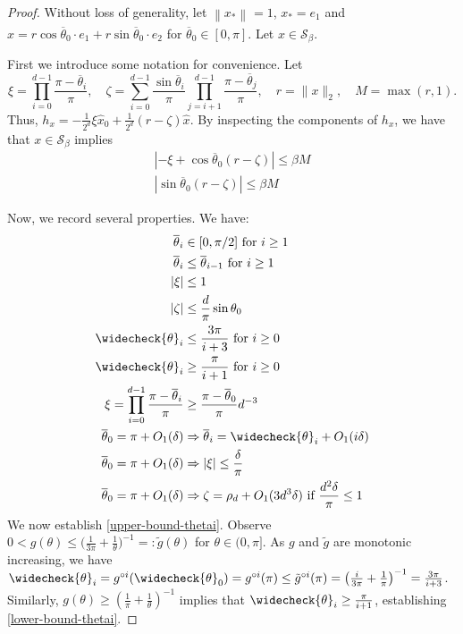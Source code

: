 \documentclass[11pt]{article}
\newcommand{\gtilde}{\tilde{g}}
\newcommand{\thetabar}{\overline{\theta}}
\newcommand{\thetacheck}{\widecheck{\theta}}
\newcommand{\zetacheck}{\rho}
\newcommand{\xo}{x_\ast}
\newcommand{\xhat}{\hat{x}}
\newcommand{\xohat}{\hat{x}_0}
\newcommand{\Pipithetapii}{\prod_{i=0}^{d-1} \frac{\pi - \thetabar_i}{\pi}}
\newcommand{\zetaterm}{\sum_{i=0}^{d-1} \frac{\sin \thetabar_i}{\pi} \prod_{j=i+1}^{d-1} \frac{\pi - \thetabar_j}{\pi}}
\newcommand{\hx}{h_x}
\newcommand{\Tnorm}{}
\newcommand\norm[2][\Tnorm]{\ensuremath{{\left\|#2\right\|}_{#1}}}
\newcommand\setS{\mathcal S}
\begin{document}
\begin{proof}
Without loss of generality, let $\norm{\xo}
 =1$, $\xo = e_1$ and $\xhat = r \cos \thetabar_0 \cdot e_1 + r \sin \thetabar_0 \cdot e_2$ for $\thetabar_0 \in [0, \pi]$.  Let $x \in \setS_\beta$.

First we introduce some notation for convenience.  Let
\[
\xi = \Pipithetapii, \quad \zeta = \zetaterm, \quad r = \|x\|_2, \quad M = \max(r, 1).
\]
Thus, $\hx = - \frac{1}{2^d}\xi  \xohat + \frac{1}{2^d} (r- \zeta) \xhat$.
By inspecting the components of $\hx$, we have that $x\in \setS_\beta$ implies
\begin{align}
|-\xi + \cos \thetabar_0 ( r - \zeta)| \leq \beta M \label{Seps-e1term}\\
|\sin \thetabar_0 (r - \zeta)| \leq \beta M \label{Seps-e2term}
\end{align}

Now, we record several properties.  We have:
\begin{align}
\thetabar_{i} &\in [0, \pi/2] \text{ for } i \geq 1 \notag \\
\thetabar_{i} &\leq \thetabar_{i-1} \text{ for } i \geq 1 \notag\\
 |\xi| &\leq 1 \label{bound-c-one}\\
| \zeta| &\leq \frac{d}{\pi} \sin \theta_0 \label{zeta-bound-d-sin-theta} \\
\thetacheck_i &\leq \frac{3\pi}{i+3} \text{ for $i \geq 0$} \label{upper-bound-thetai}\\
\thetacheck_i &\geq \frac{\pi}{i+1} \text{ for $i \geq 0$} \label{lower-bound-thetai}\\
\xi = \prod_{i=0}^{d-1} \frac{\pi - \thetabar_i}{\pi} &\geq \frac{\pi - \thetabar_0}{\pi } d^{-3} \label{pi-theta-pi-d-cubed}\\
\thetabar_0 = \pi + O_1(\delta) &\Rightarrow \thetabar_i = \thetacheck_i + O_1(i \delta) \label{thetabar-thetacheck-bound}\\
\thetabar_0 = \pi + O_1(\delta) &\Rightarrow |\xi| \leq \frac{\delta}{\pi} \label{c-one-bound-thetabarzero}\\
\thetabar_0 = \pi + O_1(\delta) &\Rightarrow \zeta = \zetacheck_d + O_1(3 d^3 \delta) \text{ if } \frac{d^2 \delta}{\pi} \leq 1 \label{high-theta-zeta-zetabar-control}
\end{align}
We now establish \eqref{upper-bound-thetai}.  Observe $0< g(\theta) \leq \bigl( \frac{1}{3 \pi} + \frac{1}{\theta} \bigr)^{-1} =: \gtilde(\theta)$ for $\theta \in (0, \pi]$.  As $g$ and $\gtilde$ are monotonic increasing, we have $\thetacheck_i = g^{\circ i}(\thetacheck_0) = g^{\circ i}(\pi) \leq \gtilde^{\circ i}(\pi) = \bigl( \frac{i}{3 \pi} + \frac{1}{\pi} \bigr)^{-1} = \frac{3\pi}{i + 3}$.  Similarly, $g(\theta) \geq (\frac{1}{\pi} + \frac{1}{\theta})^{-1}$ implies that $\thetacheck_i \geq \frac{\pi}{i+1}$, establishing \eqref{lower-bound-thetai}.


\end{proof}
\end{document}
